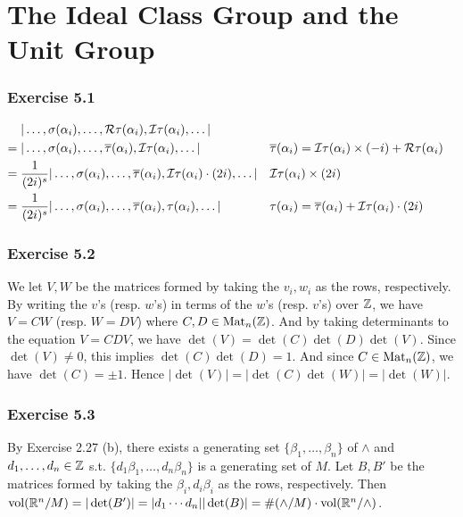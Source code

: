 \documentclass[../Marcus.tex]{subfiles}
\begin{document}
\chapter{The Ideal Class Group and the Unit Group}

\subsection*{Exercise 5.1}

\begin{align*}
&|\ldots,\sigma(\alpha_i),\ldots,\mathcal{R}\tau(\alpha_i),\mathcal{I}\tau(\alpha_i),\ldots|     \\
={} &|\ldots,\sigma(\alpha_i),\ldots,\overline{\tau}(\alpha_i),\mathcal{I}\tau(\alpha_i),\ldots|  
&&\overline{\tau}(\alpha_i) = \mathcal{I} \tau(\alpha_i) \times (-i) + \mathcal{R} \tau(\alpha_i)       \\
={} &\frac{1}{(2i)^s} |\ldots,\sigma(\alpha_i),\ldots,\overline{\tau}(\alpha_i),\mathcal{I}\tau(\alpha_i)\cdot(2i),\ldots| 
&&\mathcal{I} \tau(\alpha_i) \times (2i)    \\
={} &\frac{1}{(2i)^s} |\ldots,\sigma(\alpha_i),\ldots,\overline{\tau}(\alpha_i),\tau(\alpha_i),\ldots|  
&&\tau(\alpha_i) = \overline{\tau}(\alpha_i) + \mathcal{I}\tau(\alpha_i)\cdot(2i)
\end{align*}

\subsection*{Exercise 5.2}

We let $V,W$ be the matrices formed by taking the $v_i,w_i$ as the rows, respectively. By writing the $v$'s (resp. $w$'s) in terms of the $w$'s (resp. $v$'s) over $\mathbb{Z}$, we have $V=CW$ (resp. $W=DV$) where $C,D \in \operatorname{Mat}_n(\mathbb{Z})$. And by taking determinants to the equation $V=CDV$, we have $\det(V) = \det(C)\det(D)\det(V)$. Since $\det(V)\neq0$, this implies $\det(C)\det(D)=1$. And since $C \in \operatorname{Mat}_n(\mathbb{Z})$, we have $\det(C)=\pm1$. Hence $|\det(V)| = |\det(C) \det(W)| = |\det(W)|$.

\subsection*{Exercise 5.3}

By Exercise 2.27 (b), there exists a generating set $\{\beta_1,\ldots,\beta_n\}$ of $\wedge$ and $d_1,\ldots,d_n \in \mathbb{Z}$ s.t. $\{d_1\beta_1,\ldots,d_n\beta_n\}$ is a generating set of $M$. Let $B,B'$ be the matrices formed by taking the $\beta_i,d_i\beta_i$ as the rows, respectively. Then $\operatorname{vol}(\mathbb{R}^n/M) = |\det(B')| = |d_1\cdots d_n| |\det(B)| = \#(\wedge/M) \cdot \operatorname{vol}(\mathbb{R}^n/\wedge)$.
\end{document}
